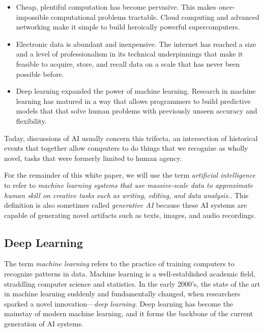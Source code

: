 \documentclass[12pt, oneside]{article}   	%
\begin{document}
\begin{itemize}
\item Cheap, plentiful computation has become pervasive.  This makes once-impossible computational problems tractable. Cloud computing and advanced networking make it simple to build heroically powerful supercomputers.
\item Electronic data is abundant and inexpensive.  The internet has reached a size and a level of professionalism in its technical underpinnings that make it feasible to acquire, store, and recall data on a scale that has never been possible before.
\item Deep learning expanded the power of machine learning. Research in machine learning has matured in a way that allows programmers to build predictive models that that solve human problems with previously unseen accuracy and flexibility.   
\end{itemize}

Today, discussions of AI usually concern this trifecta, an intersection of historical events that together allow computers to do things that we recognize as wholly novel, tasks that were formerly limited to human agency.

For the remainder of this white paper, we will use the term \emph{artificial intelligence} to refer to \emph{machine learning systems that use massive-scale data to approximate human skill on creative tasks such as writing, editing, and data analysis.}.   This definition is also sometimes called \emph{generative AI} because these AI systems are capable of generating novel artifacts such as texts, images, and audio recordings.


\subsection{Deep Learning}\label{section.definitions.deep-learning}
The term \emph{machine learning} refers to the practice of training computers to recognize patterns in data.  Machine learning is a well-established academic field, straddling computer science and statistics.  In the early 2000’s, the state of the art in machine learning suddenly and fundamentally changed, when researchers sparked a novel innovation—\emph{deep learning.}  Deep learning has become the mainstay of modern machine learning, and it forms the backbone of the current generation of AI systems.
\end{document}
